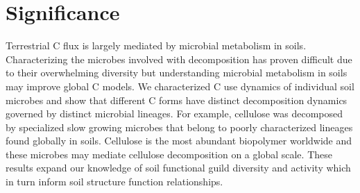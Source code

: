 \section{Significance} Terrestrial C flux is largely mediated by microbial
metabolism in soils. Characterizing the microbes involved with decomposition
has proven difficult due to their overwhelming diversity but understanding
microbial metabolism in soils may improve global C models. We characterized
C use dynamics of individual soil microbes and show that different C forms have
distinct decomposition dynamics governed by distinct microbial lineages. For
example, cellulose was decomposed by specialized slow growing microbes that
belong to poorly characterized lineages found globally in soils. Cellulose is
the most abundant biopolymer worldwide and these microbes may mediate cellulose
decomposition on a global scale. These results expand our knowledge of soil
functional guild diversity and activity which in turn inform soil structure
function relationships.
